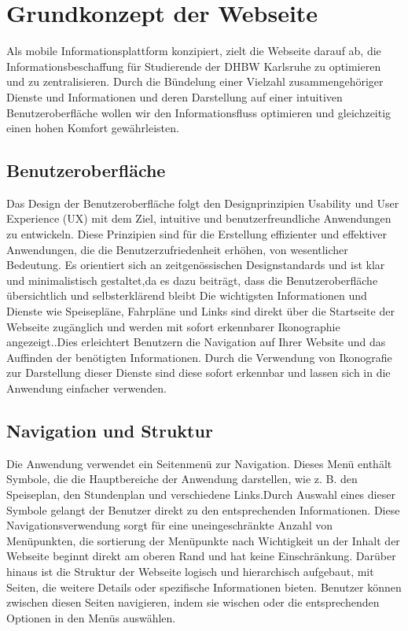 \newpage
\section{Grundkonzept der Webseite}
Als mobile Informationsplattform konzipiert, zielt die Webseite darauf ab, die Informationsbeschaffung für Studierende der DHBW Karlsruhe zu optimieren und zu zentralisieren. Durch die Bündelung einer Vielzahl zusammengehöriger Dienste und Informationen und deren Darstellung auf einer intuitiven Benutzeroberfläche wollen wir den Informationsfluss optimieren und gleichzeitig einen hohen Komfort gewährleisten.
\subsection{Benutzeroberfläche}
Das Design der Benutzeroberfläche folgt den Designprinzipien Usability und User Experience (UX)  mit dem Ziel,  intuitive und benutzerfreundliche Anwendungen zu entwickeln\cite{hartmann2017usability}. Diese Prinzipien sind  für die Erstellung effizienter und effektiver Anwendungen, die die Benutzerzufriedenheit erhöhen, von wesentlicher Bedeutung\cite{14all}. Es orientiert sich an zeitgenössischen Designstandards und ist klar und minimalistisch gestaltet,da es dazu beiträgt, dass die Benutzeroberfläche übersichtlich und selbsterklärend bleibt\cite{massiveart}
Die wichtigsten Informationen und Dienste wie Speisepläne, Fahrpläne und Links sind direkt über die Startseite der Webseite zugänglich und werden mit sofort erkennbarer Ikonographie angezeigt..Dies erleichtert Benutzern die Navigation auf Ihrer Website und das Auffinden der benötigten Informationen. Durch die  Verwendung von Ikonografie zur Darstellung dieser Dienste sind diese sofort erkennbar und lassen sich in die Anwendung einfacher verwenden\cite{99designs}. 



\subsection{Navigation und Struktur}
Die Anwendung verwendet ein Seitenmenü zur Navigation. Dieses Menü enthält Symbole, die die Hauptbereiche der Anwendung darstellen, wie z. B. den Speiseplan, den Stundenplan und verschiedene Links.Durch Auswahl eines dieser Symbole gelangt der Benutzer direkt zu den entsprechenden Informationen. Diese Navigationsverwendung sorgt für eine uneingeschränkte  Anzahl von Menüpunkten, die sortierung der Menüpunkte nach Wichtigkeit un der Inhalt der Webseite beginnt direkt am oberen Rand und hat keine Einschränkung\cite{eology2023}.
Darüber hinaus ist die Struktur der Webseite logisch und hierarchisch aufgebaut, mit Seiten, die weitere Details oder spezifische Informationen bieten. Benutzer können zwischen diesen Seiten navigieren, indem sie wischen oder die entsprechenden Optionen in den Menüs auswählen.

